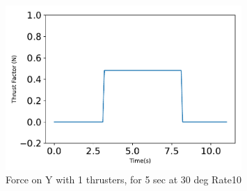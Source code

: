 \begin{figure}[htbp]\centerline{\includegraphics[width=0.8\textwidth]{AutoTeX/Force_1Thrusters_5s_30deg_Loc2_Rate10}}\caption{Force on Y with 1 thrusters, for 5 sec at 30 deg Rate10}\label{fig:Force_1Thrusters_5s_30deg_Loc2_Rate10}\end{figure}